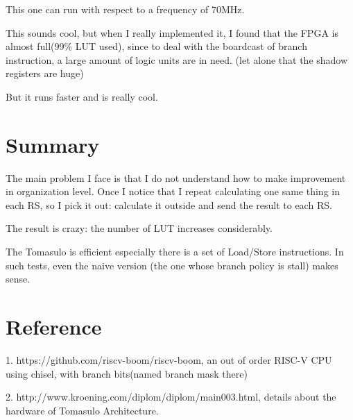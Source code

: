\documentclass[12pt,letterpaper]{article}
\begin{document}
    This one can run with respect to a frequency of 70MHz. 

    This sounds cool, but when I really implemented it, I found that the FPGA is almost full(99\% LUT used), since to deal with the 
    boardcast of branch instruction, a large amount of logic units are in need. (let alone that the shadow registers are huge)

    But it runs faster and is really cool. 
\section{Summary}
    The main problem I face is that I do not understand how to make improvement in organization level. Once I notice that I repeat 
    calculating one same thing in each RS, so I pick it out: calculate it outside and send the result to each RS. 

    The result is crazy: the number of LUT increases considerably. 

    The Tomasulo is efficient especially there is a set of Load/Store instructions. In such tests, even the naive version
    (the one whose branch policy is stall) makes sense. 
\section{Reference}

1. https://github.com/riscv-boom/riscv-boom, an out of order RISC-V CPU using chisel, with branch bits(named branch mask there)

2. http://www.kroening.com/diplom/diplom/main003.html, details about the hardware of Tomasulo Architecture.
\end{document}
